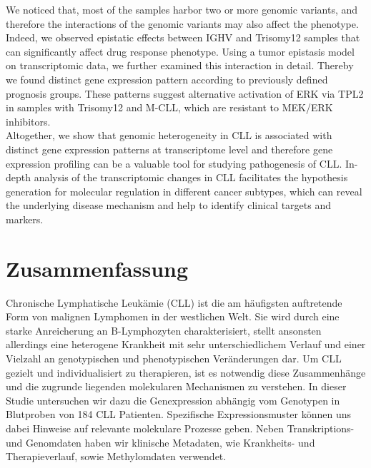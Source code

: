 \documentclass[a4paper,fontsize=12pt,headsepline]{scrartcl}
\begin{document}
We noticed that, most of the samples harbor two or more genomic variants, and therefore the interactions of the genomic variants may also affect the phenotype.  Indeed, we observed epistatic effects between IGHV and Trisomy12 samples that can significantly affect drug response phenotype. Using a tumor epistasis model on transcriptomic data, we further examined this interaction in detail. Thereby we found distinct gene expression pattern according to previously defined prognosis groups. These patterns suggest alternative activation of ERK via TPL2 in samples with Trisomy12 and M-CLL, which are resistant to MEK/ERK inhibitors.  \\

Altogether, we show that genomic heterogeneity in CLL is associated with distinct gene expression patterns at transcriptome level and therefore gene expression profiling can be a valuable tool for studying pathogenesis of CLL. In-depth analysis of the transcriptomic changes in CLL facilitates the hypothesis generation for molecular regulation in different cancer subtypes, which can reveal the underlying disease mechanism and help to identify clinical targets and markers. \\



\cleardoublepage

\section*{Zusammenfassung}
Chronische Lymphatische Leukämie (CLL) ist die am häufigsten auftretende Form von malignen Lymphomen in der westlichen Welt. Sie wird durch eine starke Anreicherung an B-Lymphozyten charakterisiert, stellt ansonsten allerdings eine heterogene Krankheit mit sehr unterschiedlichem Verlauf und einer Vielzahl an genotypischen und phenotypischen Veränderungen dar. Um CLL gezielt und individualisiert zu therapieren, ist es notwendig diese Zusammenhänge und die zugrunde liegenden molekularen Mechanismen zu verstehen. In dieser Studie untersuchen wir dazu die Genexpression abhängig vom Genotypen in Blutproben von 184 CLL Patienten. Spezifische Expressionsmuster können uns dabei Hinweise auf relevante molekulare Prozesse geben. Neben Transkriptions- und Genomdaten haben wir klinische Metadaten, wie Krankheits- und Therapieverlauf, sowie Methylomdaten verwendet. \\
\end{document}
